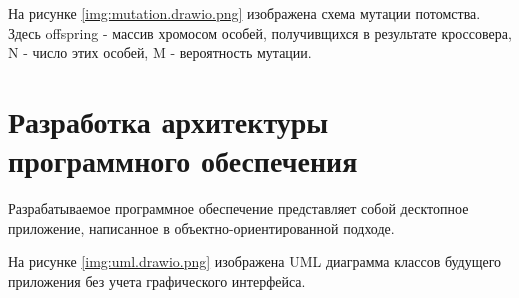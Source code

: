 \newpage
На рисунке \ref{img:mutation.drawio.png} изображена схема мутации потомства. Здесь offspring - массив хромосом особей, получивщихся в результате кроссовера, N - число этих особей, M - вероятность мутации.



\section{Разработка архитектуры программного обеспечения}

Разрабатываемое программное обеспечение представляет собой десктопное приложение, написанное в объектно-ориентированной подходе.

На рисунке \ref{img:uml.drawio.png} изображена UML диаграмма классов будущего приложения без учета графического интерфейса. 

